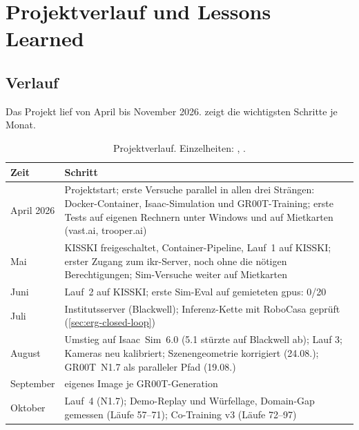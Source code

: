 
\chapter{Projektverlauf und Lessons Learned}
\label{chap:projektverlauf}

\section{Verlauf}
\label{sec:verlauf}
\label{sec:hindernisse}

Das Projekt lief von April bis November 2026.  zeigt die wichtigsten Schritte
je Monat.

\begin{table}[htb]
  \centering
  \begin{tabularx}{\linewidth}{lX}
    \toprule
    Zeit & Schritt \\
    \midrule
    April 2026 & Projektstart; erste Versuche parallel in allen drei Strängen: Docker-Container,
           Isaac-Simulation und GR00T-Training; erste Tests auf eigenen Rechnern unter Windows
           und auf Mietkarten (vast.ai, trooper.ai) \\
    Mai & KISSKI freigeschaltet, Container-Pipeline, Lauf~1 auf KISSKI; erster Zugang zum
          \acs{ikr}-Server, noch ohne die nötigen Berechtigungen; Sim-Versuche weiter auf Mietkarten \\
    Juni & Lauf~2 auf KISSKI; erste Sim-Eval auf gemieteten \acp{gpu}: 0/20 \\
    Juli & Institutsserver (Blackwell); Inferenz-Kette mit RoboCasa geprüft
           (\cref{sec:erg-closed-loop}) \\
    August & Umstieg auf Isaac~Sim~6.0 (5.1 stürzte auf Blackwell ab); Lauf 3;
             Kameras neu kalibriert; Szenengeometrie korrigiert (24.08.);
             GR00T~N1.7 als paralleler Pfad (19.08.) \\
    September & eigenes Image je GR00T-Generation \\
    Oktober & Lauf~4 (N1.7); Demo-Replay und Würfellage, Domain-Gap gemessen (Läufe 57--71);
              Co-Training v3 (Läufe 72--97) \\
    \bottomrule
  \end{tabularx}
  \caption{Projektverlauf. Einzelheiten: ,
    .}
  \label{tab:verlauf}
\end{table}

